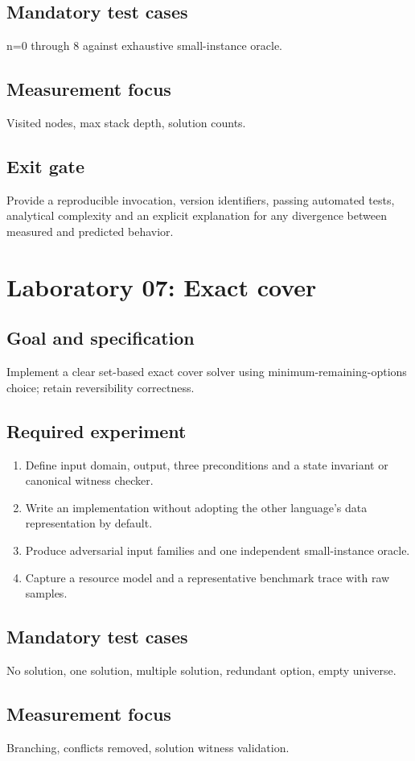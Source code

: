 \documentclass[11pt,letterpaper]{article}
\begin{document}
\subsection{Mandatory test cases}
n=0 through 8 against exhaustive small-instance oracle.
\subsection{Measurement focus}
Visited nodes, max stack depth, solution counts.
\subsection{Exit gate}
Provide a reproducible invocation, version identifiers, passing automated tests, analytical complexity and an explicit explanation for any divergence between measured and predicted behavior.

\section{Laboratory 07: Exact cover}
\subsection{Goal and specification}
Implement a clear set-based exact cover solver using minimum-remaining-options choice; retain reversibility correctness.
\subsection{Required experiment}
\begin{enumerate}
\item Define input domain, output, three preconditions and a state invariant or canonical witness checker.
\item Write an implementation without adopting the other language's data representation by default.
\item Produce adversarial input families and one independent small-instance oracle.
\item Capture a resource model and a representative benchmark trace with raw samples.
\end{enumerate}
\subsection{Mandatory test cases}
No solution, one solution, multiple solution, redundant option, empty universe.
\subsection{Measurement focus}
Branching, conflicts removed, solution witness validation.
\end{document}
